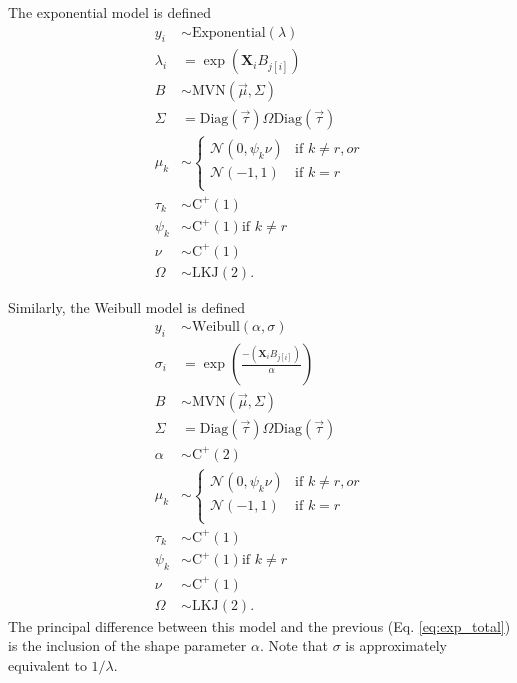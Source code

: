 \documentclass[12pt,letterpaper]{article}
\begin{document}
The exponential model is defined
\begin{equation}
  \begin{aligned}
    y_{i} &\sim \mathrm{Exponential}(\lambda) \\
    \lambda_{i} &= \exp(\mathbf{X}_{i} B_{j[i]}) \\
    B &\sim \mathrm{MVN}(\vec{\mu}, \Sigma) \\
    \Sigma &= \text{Diag}(\vec{\tau}) \Omega \text{Diag}(\vec{\tau}) \\
    \mu_{k} &\sim 
    \begin{cases} 
      \mathcal{N}(0, \psi_{k} \nu) & \text{if } k \neq r, or \\
      \mathcal{N}(-1, 1) & \text{if } k = r \\
    \end{cases} \\
    \tau_{k} &\sim \mathrm{C^{+}}(1) \\
    \psi_{k} &\sim \mathrm{C^{+}}(1) \text{if } k \neq r \\
    \nu &\sim \mathrm{C^{+}}(1) \\
    \Omega &\sim \text{LKJ}(2).
  \end{aligned}
  \label{eq:exp_total}
\end{equation}

Similarly, the Weibull model is defined
\begin{equation}
  \begin{aligned}
    y_{i} &\sim \mathrm{Weibull}(\alpha, \sigma) \\
    \sigma_{i} &= \exp\left(\frac{-(\mathbf{X}_{i} B_{j[i]})}{\alpha}\right) \\
    B &\sim \mathrm{MVN}(\vec{\mu}, \Sigma) \\
    \Sigma &= \text{Diag}(\vec{\tau}) \Omega \text{Diag}(\vec{\tau}) \\
    \alpha &\sim \mathrm{C^{+}}(2) \\
    \mu_{k} &\sim 
    \begin{cases} 
      \mathcal{N}(0, \psi_{k} \nu) & \text{if } k \neq r, or \\
      \mathcal{N}(-1, 1) & \text{if } k = r \\ 
    \end{cases} \\
    \tau_{k} &\sim \mathrm{C^{+}}(1) \\
    \psi_{k} &\sim \mathrm{C^{+}}(1) \text{if } k \neq r \\
    \nu &\sim \mathrm{C^{+}}(1) \\
    \Omega &\sim \text{LKJ}(2).
  \end{aligned}
  \label{eq:wei_total}
\end{equation}
The principal difference between this model and the previous (Eq. \ref{eq:exp_total}) is the inclusion of the shape parameter \(\alpha\). Note that \(\sigma\) is approximately equivalent to \(1 / \lambda\).
\end{document}
